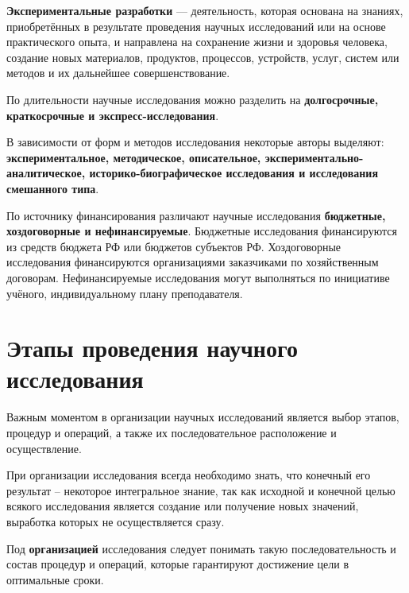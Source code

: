\textbf{Экспериментальные разработки} --- деятельность, которая основана на
знаниях, приобретённых в результате проведения научных исследований или на
основе практического опыта, и направлена на сохранение жизни и здоровья человека, создание новых материалов, продуктов, процессов, устройств, услуг,
систем или методов и их дальнейшее совершенствование.

По длительности научные исследования можно разделить на
\textbf{долгосрочные, краткосрочные и экспресс-исследования}. \cite{lit2}

В зависимости от форм и методов исследования некоторые авторы
выделяют: \textbf{экспериментальное, методическое, описательное,
экспериментально-аналитическое, историко-биографическое исследования и
исследования смешанного типа}. \cite{lit2}

По источнику финансирования различают научные исследования
\textbf{бюджетные, хоздоговорные и нефинансируемые}. Бюджетные исследования
финансируются из средств бюджета РФ или бюджетов субъектов РФ.
Хоздоговорные исследования финансируются организациями заказчиками по
хозяйственным договорам. Нефинансируемые исследования могут выполняться
по инициативе учёного, индивидуальному плану преподавателя. \cite{lit3}

\section{Этапы проведения научного исследования}

Важным моментом в организации научных исследований является выбор
этапов, процедур и операций, а также их последовательное расположение и
осуществление. \cite{lit4}

При организации исследования всегда необходимо знать, что конечный его
результат – некоторое интегральное знание, так как исходной и конечной целью
всякого исследования является создание или получение новых значений,
выработка которых не осуществляется сразу.~\cite{lit5}

Под \textbf{организацией} исследования следует понимать такую
последовательность и состав процедур и операций, которые гарантируют
достижение цели в оптимальные сроки. \cite{lit5}

